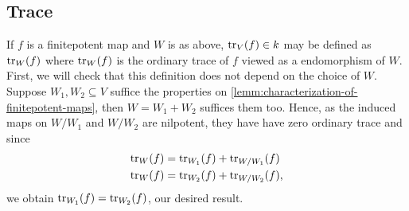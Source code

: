 \subsection*{Trace}
If $f$ is a finitepotent map and $W$ is as above, $\operatorname{tr}_{V}(f)\in k$ may be defined as $\operatorname{tr}_{W}(f)$ where $\operatorname{tr}_{W}(f)$ is the ordinary trace of $f$ viewed as a endomorphism of $W$. First, we will check that this definition does not depend on the choice of $W$. Suppose $W_{1}, W_{2} \subseteq V$ suffice the properties on \cref{lemm:characterization-of-finitepotent-maps}, then $W = W_{1} + W_{2}$ suffices them too. Hence, as the induced maps on $W/W_{1}$ and $W/W_{2}$ are nilpotent, they have have zero ordinary trace and since
\begin{align*}
	\operatorname{tr}_{W}(f) &= \operatorname{tr}_{W_{1}}(f) + \operatorname{tr}_{W/W_{1}}(f) \\
	\operatorname{tr}_{W}(f) &= \operatorname{tr}_{W_{2}}(f) + \operatorname{tr}_{W/W_{2}}(f),
\end{align*}
we obtain $\operatorname{tr}_{W_{1}}(f) = \operatorname{tr}_{W_{2}}(f)$, our desired result. 

